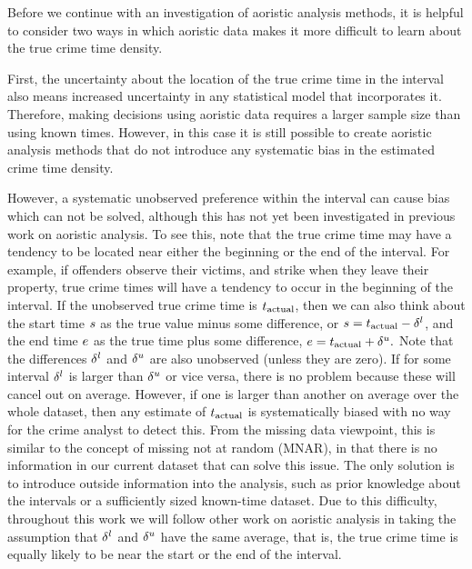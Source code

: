Before we continue with an investigation of aoristic analysis methods, it is helpful to consider two ways in which aoristic data makes it more difficult to learn about the true crime time density.

First, the uncertainty about the location of the true crime time in the interval also means increased uncertainty in any statistical model that incorporates it. Therefore, making decisions using aoristic data requires a larger sample size than using known times. However, in this case it is still possible to create aoristic analysis methods that do not introduce any systematic bias in the estimated crime time density.

However, a systematic unobserved preference within the interval can cause bias which can not be solved, although this has not yet been investigated in previous work on aoristic analysis. To see this, note that the true crime time may have a tendency to be located near either the beginning or the end of the interval. For example, if offenders observe their victims, and strike when they leave their property, true crime times will have a tendency to occur in the beginning of the interval. If the unobserved true crime time is $t_{\text{actual}}$, then we can also think about the start time $s$ as the true value minus some difference, or $s = t_{\text{actual}} - {\delta^l}$, and the end time $e$ as the true time plus some difference, $e = t_{\text{actual}} + {\delta^u}.$ Note that the differences ${\delta^l}$ and ${\delta^u}$ are also unobserved (unless they are zero). If for some interval ${\delta^l}$ is larger than ${\delta^u}$ or vice versa, there is no problem because these will cancel out on average. However, if one is larger than another on average over the whole dataset, then any estimate of $t_{\text{actual}}$ is systematically biased with no way for the crime analyst to detect this. From the missing data viewpoint, this is similar to the concept of missing not at random (MNAR), in that there is no information in our current dataset that can solve this issue. The only solution is to introduce outside information into the analysis, such as prior knowledge about the intervals or a sufficiently sized known-time dataset. Due to this difficulty, throughout this work we will follow other work on aoristic analysis in taking the assumption that ${\delta^l}$ and ${\delta^u}$ have the same average, that is, the true crime time is equally likely to be near the start or the end of the interval.

